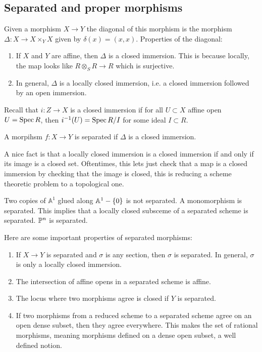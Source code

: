 \documentclass[12pt]{article}
\begin{document}
\subsection{Separated and proper morphisms}
Given a morphism $X\to Y$ the diagonal of this morphism is the morphism $\Delta: X \to X \times_Y X$ given by $\delta(x) = (x,x)$. Properties of the diagonal: \begin{enumerate}
    \item If $X$ and $Y$ are affine, then $\Delta$ is a closed immersion. This is because locally, the map looks like $R \otimes_S R \to R$ which is surjective.
    \item In general, $\Delta$ is a locally closed immersion, i.e. a closed immersion followed by an open immersion.
\end{enumerate} Recall that $i:Z\to X$ is a closed immersion if for all $U\subset X$ affine open $U = \Spec R$, then $i^{-1}(U) = \Spec R/I$ for some ideal $I\subset R$. 
\begin{definition}
    A morpihsm $f:X\to Y$ is separated if $\Delta$ is a closed immersion. 
\end{definition}
A nice fact is that a locally closed immersion is a closed immersion if and only if its image is a closed set. Oftentimes, this lets just check that a map is a closed immersion by checking that the image is closed, this is reducing a scheme theoretic problem to a topological one.
\begin{example}
    Two copies of $\mathbb{A}^1$ glued along $\A^1 - \{0\}$ is not separated. A monomorphism is separated. This implies that a locally closed subsceme of a separated scheme is separated. $\P^n$ is separated.
\end{example}
Here are some important properties of separated morphisms:
\begin{enumerate}
    \item If $X\to Y$ is separated and $\sigma$ is any section, then $\sigma$ is separated. In general, $\sigma$ is only a locally closed immersion.
    \item The intersection of affine opens in a separated scheme is affine.
    \item The locus where two morphisms agree is closed if $Y$ is separated.
    \item If two morphisms from a reduced scheme to a separated scheme agree on an open dense subset, then they agree everywhere. This makes the set of rational morphisms, meaning morphisms defined on a dense open subset, a well defined notion.
\end{enumerate}
\end{document}
